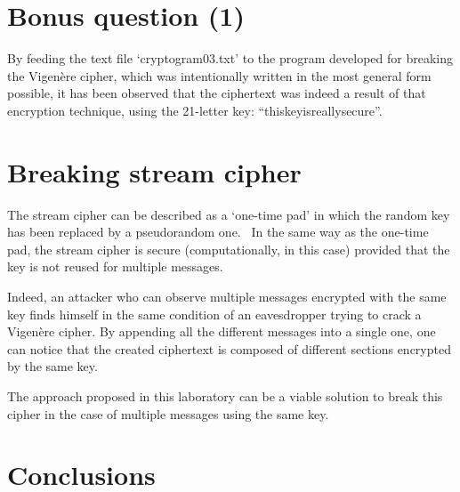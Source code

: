 \documentclass[12pt]{article}
\begin{document}
\section{Bonus question (1)}

By feeding the text file `cryptogram03.txt' to the program developed for breaking the Vigenère cipher, which was intentionally written in the most general form possible, it has been observed that the ciphertext was indeed a result of that encryption technique, using the 21-letter key: ``thiskeyisreallysecure''.

\section{Breaking stream cipher}

The stream cipher can be described as a `one-time pad' in which the random key has been replaced by a pseudorandom one. \
In the same way as the one-time pad, the stream cipher is secure (computationally, in this case) provided that the key is not reused for multiple messages.

Indeed, an attacker who can observe multiple messages encrypted with the same key finds himself in the same condition of an eavesdropper trying to crack a Vigenère cipher. By appending all the different messages into a single one, one can notice that the created ciphertext is composed of different sections encrypted by the same key.

The approach proposed in this laboratory can be a viable solution to break this cipher in the case of multiple messages using the same key.

\section{Conclusions}


\pagebreak
\end{document}
